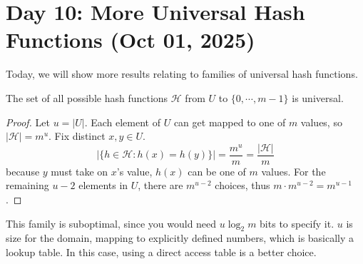 \section{Day 10: More Universal Hash Functions (Oct 01, 2025)}

Today, we will show more results relating to families of universal hash functions.

\begin{simplethm}
The set of all possible hash functions $\mathcal{H}$ from $U$ to $\{ 0, \cdots, m-1 \}$ is universal.
\end{simplethm}

\begin{proof}
    Let $u = |U|$. Each element of $U$ can get mapped to one of $m$ values, so $|\mathcal{H}| = m^u$. Fix distinct $x, y \in U$.
    \[
    |\{ h \in \mathcal{H} : h(x) = h(y) \}| = \frac{m^u}{m} = \frac{|\mathcal{H}|}{m}
    \]
    because $y$ must take on $x$'s value, $h(x)$ can be one of $m$ values. For the remaining $u - 2$ elements in $U$, there are $m^{u-2}$ choices, thus $m \cdot m^{u-2} = m^{u-1}$. 
\end{proof}

This family is suboptimal, since you would need $u \log_2 m$ bits to specify it. $u$ is size for the domain, mapping to explicitly defined numbers, which is basically a lookup table. In this case, using a direct access table is a better choice.
